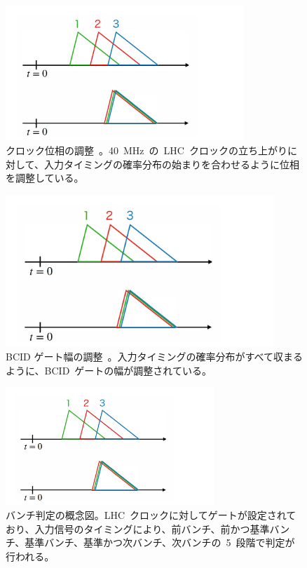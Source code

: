 \begin{figure}[H]
        \centering   
        \includegraphics[width=0.8\textwidth,page=2]{img/slide/slide.pdf}
        \caption[クロック位相の調整]{クロック位相の調整~\cite{URL:09}。40~MHz~の~LHC~クロックの立ち上がりに対して、入力タイミングの確率分布の始まりを合わせるように位相を調整している。}
        \label{fig:clock}
\end{figure}
\begin{figure}[H]
        \centering   
        \includegraphics[width=0.9\textwidth,page=3]{img/slide/slide.pdf}
        \caption[BCID~ゲート幅の調整]{BCID ゲート幅の調整~\cite{URL:09}。入力タイミングの確率分布がすべて収まるように、BCID~ゲートの幅が調整されている。}
        \label{fig:gate0}
\end{figure}
\begin{figure}[H]
        \centering   
        \includegraphics[width=0.7\textwidth,page=4]{img/slide/slide.pdf}
        \caption[バンチ判定の概念図]{バンチ判定の概念図。LHC~クロックに対してゲートが設定されており、入力信号のタイミングにより、前バンチ、前かつ基準バンチ、基準バンチ、基準かつ次バンチ、次バンチの~5~段階で判定が行われる。}
        \label{fig:bcid0}
\end{figure}

